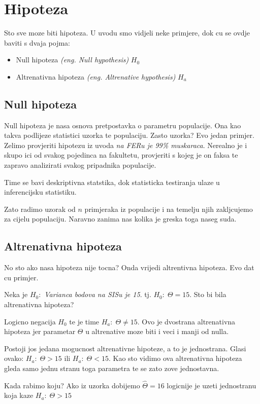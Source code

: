 \chapter{Hipoteza}
Sto sve moze biti hipoteza. U uvodu smo vidjeli neke primjere, dok cu se ovdje baviti s dvaja pojma: 
\begin{itemize}
	\item Null hipoteza \textit{(eng. Null hypothesis)} $H_0$
	\item Altrenativna hipoteza \textit{(eng. Altrenative hypothesis)} $H_a$
\end{itemize}

\section{Null hipoteza}
Null hipoteza je nasa osnova pretpostavka o parametru populacije. Ona kao takva podlijeze statistici uzorka te populaciju. Zasto uzorka? Evo jedan primjer. Zelimo provjeriti hipotezu iz uvoda \emph{na FERu je 99\% muskaraca}. Nerealno je i skupo ici od svakog pojedinca na fakultetu, provjeriti s kojeg je on faksa te zapravo analizirati svakog pripadnika populacije. 

Time se bavi deskriptivna statstika, dok statisticka testiranja ulaze u inferencijsku statistiku. 

Zato radimo uzorak od $n$ primjeraka iz populacije i na temelju njih zakljcujemo za cijelu populaciju. Naravno zanima nas kolika je greska toga naseg suda.

\section{Altrenativna hipoteza}
No sto ako nasa hipoteza nije tocna? Onda vrijedi altrentivna hipoteza. Evo dat cu primjer. 

Neka je $H_0:$ \emph{Varianca bodova na SISu je 15}. tj. $H_0:\; \Theta = 15$. Sto bi bila altrenativna hipoteza? 

Logicno negacija $H_0$ te je time $H_a:\; \Theta \ne 15$. Ovo je dvostrana altrenativna hipoteza jer parametar $\Theta$ u altrenative moze biti i veci i manji od nulla. 

Postoji jos jedana mogucnost altrenativne hipoteze, a to je jednostrana. Glasi ovako: $H_a:\; \Theta > 15$ ili $H_a:\; \Theta < 15$. Kao sto vidimo ova altrenativna hipoteza gleda samo jednu stranu toga parametra te se zato zove jednostavna. 

Kada rabimo koju? Ako iz uzorka dobijemo $\hat{\Theta} = 16$ logicnije je uzeti jednostranu koja kaze $H_a: \; \Theta > 15$

